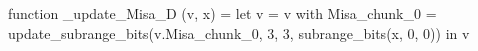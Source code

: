 function _update_Misa_D (v, x) = let v = { v with Misa_chunk_0 = update_subrange_bits(v.Misa_chunk_0, 3, 3, subrange_bits(x, 0, 0)) } in
  v
